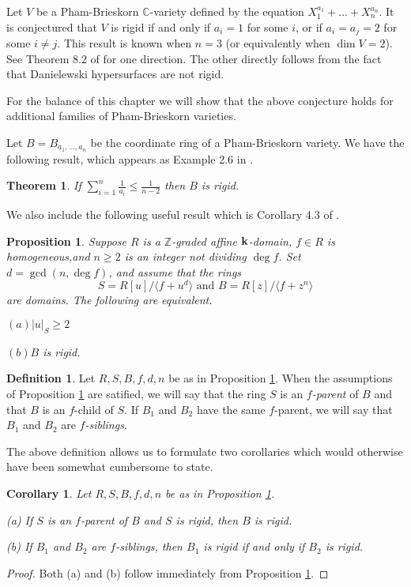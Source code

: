 \documentclass[12pt]{amsart}
\theoremstyle{plain}
\newtheorem{theorem}[subsection]{Theorem}
\newtheorem{proposition}[subsection]{Proposition}
\newtheorem{corollary}[subsection]{Corollary}
\theoremstyle{definition}
\newtheorem{definition}[subsection]{Definition}
\newcommand{\lb}{\langle}
\newcommand{\rb}{\rangle}
\newcommand{\Integ}{\ensuremath{\mathbb{Z}}}
\newcommand{\Comp}{\ensuremath{\mathbb{C}}}
\newcommand{\bk}{{\ensuremath{\rm \bf k}}}
\begin{document}
Let $V$ be a Pham-Brieskorn $\Comp$-variety defined by the equation $X_1^{a_1} + ... + X_n^{a_n}$. It is conjectured that $V$ is rigid if and only if $a_i = 1$ for some $i$, or if $a_i = a_j = 2$ for some $i \neq j$. This result is known when $n = 3$ (or equivalently when $\dim V = 2$). See Theorem 8.2 of \cite{freudenburg2013} for one direction. The other directly follows from the fact that Danielewski hypersurfaces are not rigid.   

For the balance of this chapter we will show that the above conjecture holds for additional families of Pham-Brieskorn varieties.

Let $B = B_{a_1, ..., a_n}$ be the coordinate ring of a Pham-Brieskorn variety. We have the following result, which appears as Example 2.6 in \cite{almostRigidRings}. 

\begin{theorem}\label{lowSum} If $\sum\limits_{i=1}^n \frac{1}{a_i} \leq \frac{1}{n-2}$ then $B$ is rigid. 
\end{theorem} 

We also include the following useful result which is Corollary 4.3 of \cite{freudenburg2013}.

\begin{proposition} \label{rigidDegree2}
	Suppose $R$ is a $\Integ$-graded affine $\bk$-domain, $f \in R$ is homogeneous,and $n \geq 2$ is an integer not dividing $\deg f$. Set $d = \gcd(n, \deg f)$, and assume that the rings
	$$ S = R[u] / \lb f + u^d \rb \text{ and } B = R[z] / \lb f + z^n \rb$$
	are domains. The following are equivalent.
	
	$(a) |u|_S \geq 2$
	
	$(b) B$ is rigid. 
\end{proposition}

\begin{definition}
	Let $R,S,B,f,d,n$ be as in Proposition \ref{rigidDegree2}. When the assumptions of Proposition \ref{rigidDegree2} are satified, we will say that the ring $S$ is an \textit{$f$-parent} of $B$ and that $B$ is an $f$-child of $S$. If $B_1$ and $B_2$ have the same $f$-parent, we will say that $B_1$ and $B_2$ are \textit{$f$-siblings}.   
\end{definition}

The above definition allows us to formulate two corollaries which would otherwise have been somewhat cumbersome to state. 

\begin{corollary}
	Let $R,S,B,f,d,n$ be as in Proposition \ref{rigidDegree2}. 
	
	(a) If $S$ is an $f$-parent of $B$ and $S$ is rigid, then $B$ is rigid. 
	
	(b) If $B_1$ and $B_2$ are $f$-siblings, then $B_1$ is rigid if and only if $B_2$ is rigid. 
\end{corollary}
\begin{proof}
	Both (a) and (b) follow immediately from Proposition \ref{rigidDegree2}. 
\end{proof}
\end{document}
